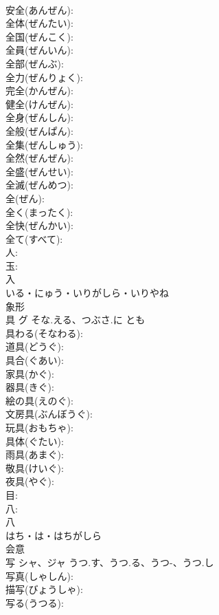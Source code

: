 \documentclass[8pt]{extreport}
\begin{document}
\begin{CJK}{UTF8}{min}
\\	安全(あんぜん): 
\\	全体(ぜんたい): 
\\	全国(ぜんこく): 
\\	全員(ぜんいん): 
\\	全部(ぜんぶ): 
\\	全力(ぜんりょく): 
\\	完全(かんぜん): 
\\	健全(けんぜん): 
\\	全身(ぜんしん): 
\\	全般(ぜんぱん): 
\\	全集(ぜんしゅう): 
\\	全然(ぜんぜん): 
\\	全盛(ぜんせい): 
\\	全滅(ぜんめつ): 
\\	全(ぜん): 
\\	全く(まったく): 
\\	全快(ぜんかい): 
\\	全て(すべて): 
\\	人: 
\\	玉: 
\\	入	
\\	いる・にゅう・いりがしら・いりやね	
\\	象形 
\\	具	グ	そな.える、つぶさ.に	とも	
\\	具わる(そなわる): 
\\	道具(どうぐ): 
\\	具合(ぐあい): 
\\	家具(かぐ): 
\\	器具(きぐ): 
\\	絵の具(えのぐ): 
\\	文房具(ぶんぼうぐ): 
\\	玩具(おもちゃ): 
\\	具体(ぐたい): 
\\	雨具(あまぐ): 
\\	敬具(けいぐ): 
\\	夜具(やぐ): 
\\	目: 
\\	八: 
\\	八	
\\	はち・は・はちがしら	
\\	会意 
\\	写	シャ、ジャ	うつ.す、うつ.る、うつ-、うつ.し		
\\	写真(しゃしん): 
\\	描写(びょうしゃ): 
\\	写る(うつる): 

\end{CJK}
\end{document}
